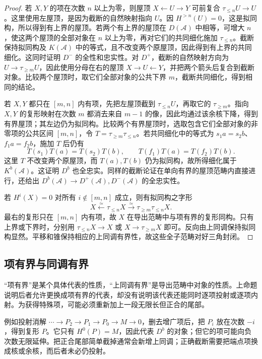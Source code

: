 \begin{proof}
	若 \(X,Y\) 的项在次数 \(n\) 以上为零，则屋顶 \(X\leftarrow U\to Y\) 可前复合 \(\tau_{\le n}U\to U\)。这里使用左屋顶，是因为截断的自然映射指向 \(U\)。因 \(H^{>n}(U)=0\)，这是拟同构，所以得到有上界的屋顶。若两个有上界的屋顶在 \(D(\mathcal A)\) 中相等，可增大 \(n\)，使这两个屋顶的全部对象在 \(n\) 以上为零，再对它们的共同细化施加 \(\tau_{\le n}\)。截断保持拟同构及 \(K(\mathcal A)\) 中的等式，且不改变两个原屋顶，因此得到有上界的共同细化。这同时证明 \(D^-\) 的全性和忠实性。对 \(D^+\)，截断的自然映射方向为 \(U\to\tau_{\ge m}U\)，因此使用分母在右的屋顶 \(X\to U\leftarrow Y\)，并把两个箭头后复合到截断对象。比较两个屋顶时，取它们全部对象的公共下界 \(m\)，截断共同细化，得到相同的结论。

	若 \(X,Y\) 都只在 \([m,n]\) 内有项，先把左屋顶截到 \(\tau_{\le n}U\)，再取它的 \(\tau_{\ge m}\)。指向 \(X,Y\) 的复形映射在次数 \(m\) 都消去来自 \(m-1\) 的像，因此均通过该余核下降，得到有界屋顶；其左边仍为拟同构。比较两个有界屋顶时，选取包含它们全部对象的非零项的公共区间 \([m,n]\)，令 \(T=\tau_{\ge m}\tau_{\le n}\)。若共同细化中的等式为 \(s_1a=s_2b\)、\(f_1a=f_2b\)，施加 \(T\) 后仍有
	\[
		T(s_1)T(a)=T(s_2)T(b), \qquad T(f_1)T(a)=T(f_2)T(b).
	\]
	这里 \(T\) 不改变两个原屋顶，而 \(T(a),T(b)\) 仍为拟同构，故所得细化属于 \(K^b(\mathcal A)\)。这证明 \(D^b\) 也全忠实。同样的截断论证在单向有界的屋顶范畴内直接进行，还给出 \(D^b(\mathcal A)\to D^+(\mathcal A),D^-(\mathcal A)\) 的全忠实性。

	若 \(H^i(X)=0\) 对所有 \(i\notin[m,n]\) 成立，则有拟同构之字形
	\[
		X\xleftarrow{\simeq}\tau_{\le n}X \xrightarrow{\simeq}\tau_{\ge m}\tau_{\le n}X.
	\]
	最右的复形只在 \([m,n]\) 内有项，故 \(X\) 在导出范畴中与项有界的复形同构。只有上界或下界时，分别用 \(\tau_{\le n}X\to X\) 或 \(X\to\tau_{\ge m}X\) 即可。反向由上同调保持拟同构显然。平移和锥保持相应的上同调有界性，故这些全子范畴对好三角封闭。
\end{proof}

\subsection{项有界与同调有界}
\label{b4:subsec:1703:02}

“项有界”是某个具体代表的性质，“上同调有界”是导出范畴中对象的性质。上命题说明后者允许更换成项有界的代表，却没有说明该代表还能同时逐项投射或逐项内射。为获得特殊项，可能必须重新加上一段无限长但正合的尾部。

\ProseParagraphBreak
例如投射消解 \(\cdots\to P_2\to P_1\to P_0\to M\to0\)，删去增广项后，把 \(P_i\) 放在次数 \(-i\)，得到复形 \(P\)。它只有 \(H^0(P)=M\)，因此代表 \(D^b\) 的对象；但它的项可能向负次数无限延伸。把正合尾部简单截掉通常会新增上同调；正确截断需要把端点项换成核或余核，而后者未必仍投射。

